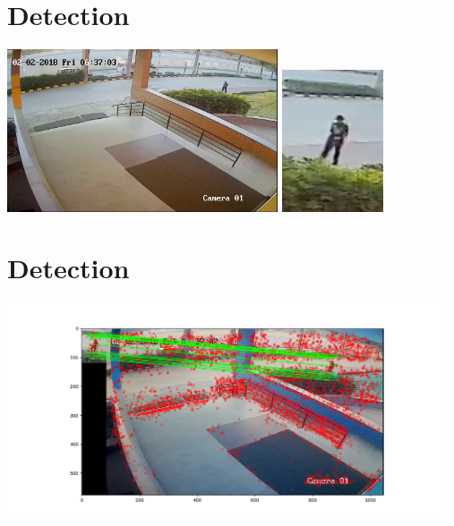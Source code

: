 \documentclass{beamer}
\begin{document}
\section{Detection}
\begin{frame}{}
  \begin{center}
    \includegraphics[width=8cm,keepaspectratio]{frame30.jpg}
    \includegraphics[width=3cm,keepaspectratio]{match.jpg}
  \end{center}
\end{frame}


\section{Detection}
\begin{frame}{}
  \begin{center}
    \includegraphics[width=13cm,keepaspectratio]{Figure_1.png}
  \end{center}
\end{frame}
\end{document}
